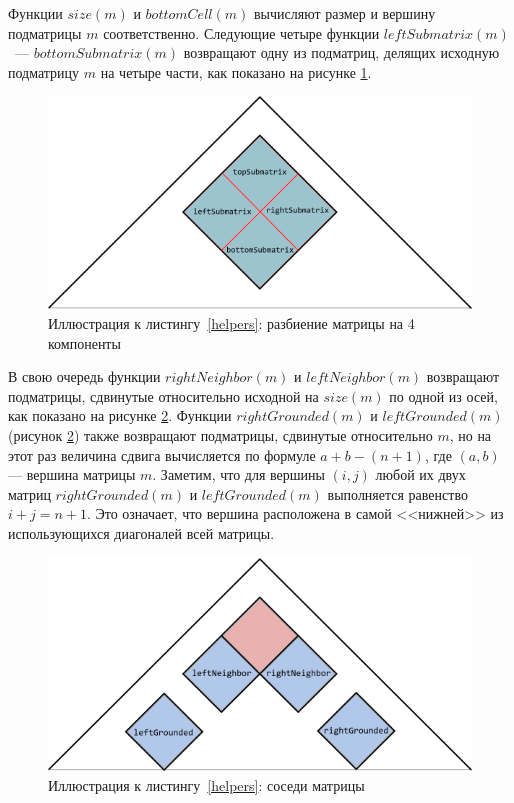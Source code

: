 \documentclass[12pt]{article}  %
\theoremstyle{definition}
\theoremstyle{remark}
\begin{document}
Функции $size(m)$ и $bottomCell(m)$ вычисляют размер и вершину подматрицы $m$ соответственно. Следующие четыре функции $leftSubmatrix(m)$~--- $bottomSubmatrix(m)$ возвращают одну из подматриц, делящих исходную подматрицу $m$ на четыре части, как показано на рисунке \ref{gr:inner}.


\begin{figure}[!ht]
  \centering
    \includegraphics[width=0.9\linewidth]{inner.png}
  \caption{Иллюстрация к листингу~\ref{helpers}: разбиение матрицы на 4 компоненты}
  \label{gr:inner}
\end{figure}

\pagebreak

В свою очередь функции $rightNeighbor(m)$ и $leftNeighbor(m)$ возвращают подматрицы, сдвинутые относительно исходной на $size(m)$ по одной из осей, как показано на рисунке \ref{gr:outer}.
Функции $rightGrounded(m)$ и $leftGrounded(m)$ (рисунок \ref{gr:outer}) также возвращают подматрицы, сдвинутые относительно $m$, но на этот раз величина сдвига вычисляется по формуле $a + b - (n + 1)$, где $(a,b)$ --- вершина матрицы $m$.
Заметим, что для вершины $(i,j)$ любой их двух матриц $rightGrounded(m)$ и $leftGrounded(m)$ выполняется равенство $i + j = n + 1$. Это означает, что вершина расположена в самой <<нижней>> из использующихся диагоналей всей матрицы. 

\begin{figure}[!ht]
  \centering
    \includegraphics[width=0.9\linewidth]{outer.png}
  \caption{Иллюстрация к листингу~\ref{helpers}: соседи матрицы}
  \label{gr:outer}
\end{figure} 
\end{document}

